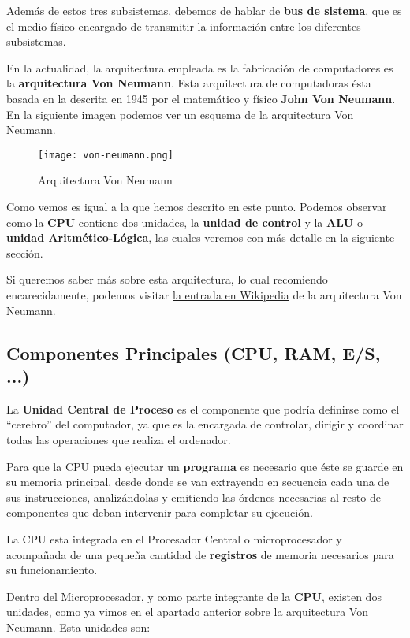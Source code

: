 Además de estos tres subsistemas, debemos de hablar de \textbf{bus de sistema}, que es el medio físico encargado de transmitir la información entre los diferentes subsistemas.

En la actualidad, la arquitectura empleada es la fabricación de computadores es la \textbf{arquitectura Von Neumann}. Esta arquitectura de computadoras ésta basada en la descrita en 1945 por el matemático y físico \textbf{John Von Neumann}. En la siguiente imagen podemos ver un esquema de la arquitectura Von Neumann.

\begin{figure}[ht]
    \centering
    \texttt{[image: von-neumann.png]}
    \caption{Arquitectura Von Neumann}
\end{figure}

Como vemos es igual a la que hemos descrito en este punto. Podemos observar como la \textbf{CPU} contiene dos unidades, la \textbf{unidad de control} y la \textbf{ALU} o \textbf{unidad Aritmético-Lógica}, las cuales veremos con más detalle en la siguiente sección.

Si queremos saber más sobre esta arquitectura, lo cual recomiendo encarecidamente, podemos visitar \href{https://es.wikipedia.org/wiki/Arquitectura_de_Von_Neumann}{la entrada en Wikipedia} de la arquitectura Von Neumann.

\subsection{Componentes Principales (CPU, RAM, E/S, ...)}
La \textbf{Unidad Central de Proceso} es el componente que podría definirse como el ``cerebro'' del computador, ya que es la encargada de controlar, dirigir y coordinar todas las operaciones que realiza el ordenador.

Para que la CPU pueda ejecutar un \textbf{\gls{programa}} es necesario que éste se guarde en su memoria principal, desde donde se van extrayendo en secuencia cada una de sus instrucciones, analizándolas y emitiendo las órdenes necesarias al resto de componentes que deban intervenir para completar su ejecución.

La CPU esta integrada en el Procesador Central o microprocesador y acompañada de una pequeña cantidad de \textbf{\gls{registros}} de memoria necesarios para su funcionamiento.

Dentro del Microprocesador, y como parte integrante de la \textbf{CPU}, existen dos unidades, como ya vimos en el apartado anterior sobre la arquitectura Von Neumann. Esta unidades son:

